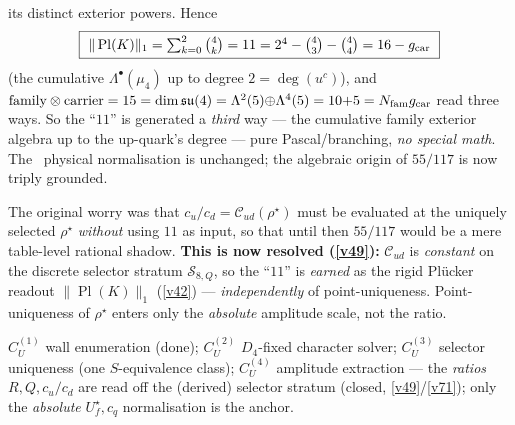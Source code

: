 \begin{keybox}
its distinct exterior powers. Hence
\[
  \boxed{\ \|\operatorname{Pl}(K)\|_1=\textstyle\sum_{k=0}^{2}\binom4k=11=2^4-\tbinom43-\tbinom44=16-\gcar\ }
\]
(the cumulative $\Lambda^\bullet(\mu_4)$ up to degree $2=\deg(u^c)$),
and $\text{family}\otimes\text{carrier}=15=\dim\mathfrak{su}(4)=\Lambda^2(5){\oplus}\Lambda^4(5)=10{+}5=N_{\mathrm{fam}}g_{\mathrm{car}}$
read three ways. So the ``$11$'' is generated a \emph{third} way --- the cumulative family exterior algebra
up to the up-quark's degree --- pure Pascal/branching, \emph{no special math}. The \mC\ physical
normalisation is unchanged; the algebraic origin of $55/117$ is now triply grounded.
\end{keybox}

\begin{lemma}
The original worry was that $c_u/c_d=\mathcal C_{ud}(\rho^\star)$ must be evaluated at the uniquely selected
$\rho^\star$ \emph{without} using $11$ as input, so that until then $55/117$ would be a mere table-level
rational shadow. \textbf{This is now resolved (\vref{v49}):} $\mathcal C_{ud}$ is \emph{constant} on the discrete
selector stratum $\mathcal S_{8,Q}$, so the ``$11$'' is \emph{earned} as the rigid Pl\"ucker readout
$\|\operatorname{Pl}(K)\|_1$ (\vref{v42}) --- \emph{independently} of point-uniqueness. Point-uniqueness of
$\rho^\star$ enters only the \emph{absolute} amplitude scale, not the ratio.
\end{lemma}

\begin{lemma}
$C_U^{(1)}$ wall enumeration (done); $C_U^{(2)}$ $D_4$-fixed character solver; $C_U^{(3)}$ selector
uniqueness (one $S$-equivalence class); $C_U^{(4)}$ amplitude extraction --- the \emph{ratios}
$R,Q,c_u/c_d$ are read off the (derived) selector stratum (closed, \vref{v49}/\vref{v71}); only the \emph{absolute}
$U_f^\star,c_q$ normalisation is the anchor.
\end{lemma}


